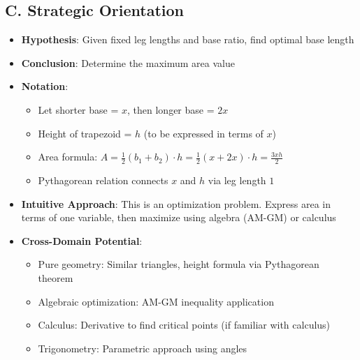 \documentclass[12pt]{article}
\begin{document}
\begin{problemconfigbox}
\subsection*{C. Strategic Orientation}
\begin{itemize}[leftmargin=*]
    \item \textbf{Hypothesis}: Given fixed leg lengths and base ratio, find optimal base length
    \item \textbf{Conclusion}: Determine the maximum area value
    \item \textbf{Notation}: 
    \begin{itemize}
        \item Let shorter base = $x$, then longer base = $2x$
        \item Height of trapezoid = $h$ (to be expressed in terms of $x$)
        \item Area formula: $A = \frac{1}{2}(b_1 + b_2) \cdot h = \frac{1}{2}(x + 2x) \cdot h = \frac{3xh}{2}$
        \item Pythagorean relation connects $x$ and $h$ via leg length $1$
    \end{itemize}
    \item \textbf{Intuitive Approach}: This is an optimization problem. Express area in terms of one variable, then maximize using algebra (AM-GM) or calculus
    \item \textbf{Cross-Domain Potential}: 
    \begin{itemize}
        \item Pure geometry: Similar triangles, height formula via Pythagorean theorem
        \item Algebraic optimization: AM-GM inequality application
        \item Calculus: Derivative to find critical points (if familiar with calculus)
        \item Trigonometry: Parametric approach using angles
    \end{itemize}
\end{itemize}
\end{problemconfigbox}
\end{document}

